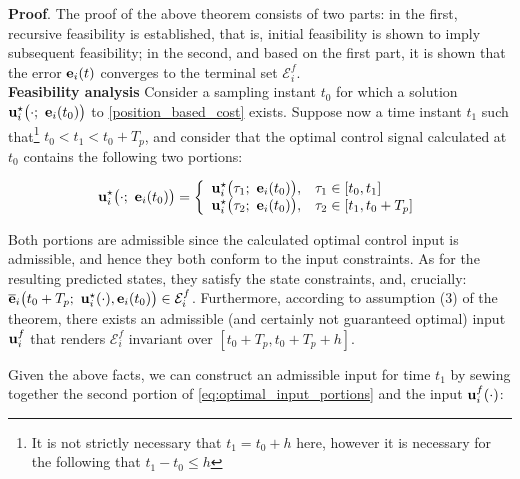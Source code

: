 \textbf{Proof}. The proof of the above theorem consists of two parts:
in the first, recursive feasibility is established, that is, initial
feasibility is shown to imply subsequent feasibility; in the second, and based
on the first part, it is shown that the error $\bm{\mathbf{e}}_i(t)$ converges to the
terminal set $\mathcal{E}_i^f$.\\

\textbf{Feasibility analysis}
Consider a sampling instant $t_0$ for which a
solution $\vect{u}_i^{\star}\big(\cdot;\ \vect{e}_i(t_0)\big)$ to
\eqref{position_based_cost} exists.
Suppose now a time instant $t_1$ such that\footnote{It is not strictly necessary
that $t_1 = t_0 + h$ here, however it is necessary for the following that
$t_1 - t_0 \leq h$} $t_0 < t_1 < t_0 + T_p$, and consider that the
optimal control signal calculated at $t_0$ contains the following two portions:

\begin{equation}
  \vect{u}_i^{\star}\big(\cdot;\ \vect{e}_i(t_0)\big) = \left\{ \\
      \begin{array}{ll}
        \vect{u}_i^{\star}\big(\tau_1;\ \vect{e}_i(t_0)\big), & \tau_1 \in [t_0, t_1] \\
        \vect{u}_i^{\star}\big(\tau_2;\ \vect{e}_i(t_0)\big), & \tau_2 \in [t_1, t_0 + T_p]
      \end{array}
      \right.
  \label{eq:optimal_input_portions}
\end{equation}

Both portions are admissible since the calculated optimal control input is
admissible, and hence they both conform to the input constraints.
As for the resulting predicted states, they satisfy the state constraints, and,
crucially: $\overline{\vect{e}}_i\big(t_0 + T_p;\ \vect{u}_i^{\star}(\cdot), \vect{e}_i(t_0)\big) \in \mathcal{E}_i^f$.
Furthermore, according to assumption (3) of the theorem, there exists an
admissible (and certainly not guaranteed optimal) input $\bm{\mathbf{u}}_i^f$ that
renders $\mathcal{E}_i^f$ invariant over $[t_0 + T_p, t_0 + T_p + h]$.

Given the above facts, we can construct an admissible input for time $t_1$
by sewing together the second portion of \eqref{eq:optimal_input_portions}
and the input $\bm{\mathbf{u}}_i^f(\cdot)$:

